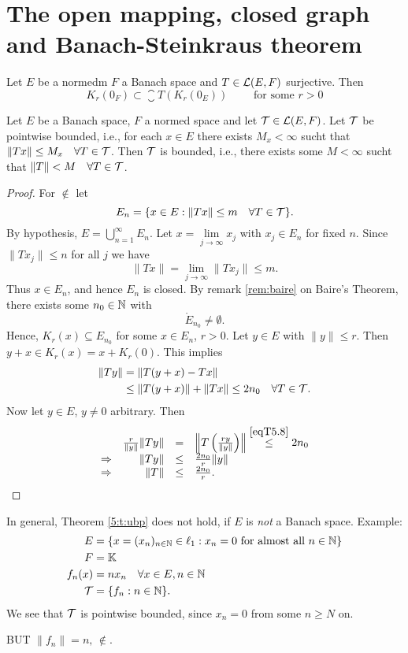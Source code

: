 \section{The open mapping, closed graph and Banach-Steinkraus theorem}

\begin{lemma}
	Let $E$ be a normedm $F$ a Banach space and $T \in \mathcal L(E,F)$ surjective. Then
	\begin{equation*}
		K_r(0_F) \subset \closure{T(K_r(0_E))} \qquad \text{ for some } r > 0
	\end{equation*}
\end{lemma}

\begin{theo}
	\label{5:t:ubp}
	Let $E$ be a Banach space, $F$ a normed space and let $\mathcal T\in\mathcal L(E,F)$. Let $\mathcal T$ be pointwise bounded, i.e., for each $x\in E$ there exists $M_x<\infty$ sucht that $\|Tx\|\leq M_x\quad\forall T\in\mathcal T$. Then $\mathcal T$ is bounded, i.e., there exists some $M<\infty$ sucht that $\|T\|<M\quad\forall T\in\mathcal T$.
\end{theo}
\begin{proof}For $\nin$ let \[E_n=\{x\in E:\|Tx\|\leq m\quad\forall T\in\mathcal T\}.\]
By hypothesis, $E=\bigcup\limits_{n=1}^\infty E_n$.
Let $x=\lim\limits_{j\to\infty}x_j$ with $x_j\in E_n$ for fixed $n$.
Since $\|Tx_j\|\leq n$ for all $j$ we have \[\|Tx\|=\lim_{j\to\infty}\|Tx_j\|\leq m.\]
Thus $x\in E_n$, and hence $E_n$ is closed.
By remark \ref{rem:baire} on Baire's Theorem, there exists some $n_0\in\mathbb{N}$ with \[\mathring E_{n_0}\neq\emptyset.\]
Hence, $K_r(x)\subseteq E_{n_0}$ for some $x\in E_n$, $r>0$.
Let $y\in E$ with $\|y\|\leq r$.
Then $y+x\in K_r(x)=x+K_r(0)$.
This implies \begin{align}\begin{split}\label{eqT5.8}\|Ty\|&=\|T(y+x)-Tx\|\\&\leq\|T(y+x)\|+\|Tx\|\leq2n_0\quad\forall T\in\mathcal T.\end{split}\end{align} Now let $y\in E$, $y\neq0$ arbitrary. Then \[\begin{array}{rrcl}&\frac r{\|y\|}\|Ty\|&=&\left\|T\left(\frac{ry}{\|y\|}\right)\right\|\overset{\ref{eqT5.8}}\leq 2n_0\\\Rightarrow&\|Ty\|&\leq&\frac{2n_0}r\|y\|\\\Rightarrow&\|T\|&\leq&\frac{2n_0}r.\end{array}\]
\end{proof}
\begin{bsp}In general, Theorem \ref{5:t:ubp} does not hold, if $E$ is \emph{not} a Banach space. Example: \begin{align*}E&=\{x=(x_n)_{n\in\mathbb{N}}\in\ell_1:x_n=0\text{ for almost all }{n\in\mathbb{N}}\}\\F&=\mathbb{K}\\f_n(x)&=nx_n\quad\forall x\in E,{n\in\mathbb{N}}\\\mathcal T&=\{f_n:{n\in\mathbb{N}}\}.\end{align*}
We see that $\mathcal T$ is pointwise bounded, since $x_n=0$ from some $n\geq N$ on.

BUT $\|f_n\|=n,\,\nin$.
\end{bsp}
